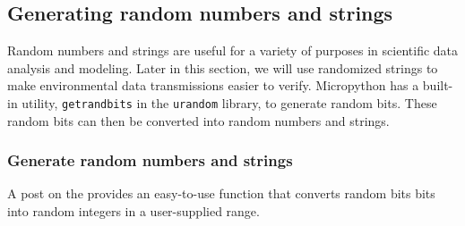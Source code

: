 \subsection{Generating random numbers and strings}
Random numbers and strings are useful for a variety of purposes in scientific data analysis and modeling. 
Later in this section, we will use randomized strings to make environmental data transmissions easier to verify.
Micropython has a built-in utility, \lstinline{getrandbits} in the \lstinline{urandom} library, to generate random bits.
These random bits can then be converted into random numbers and strings.

\subsubsection{\howto Generate random numbers and strings}
A post on the  provides an easy-to-use function that converts random bits bits into random integers in a user-supplied range.
